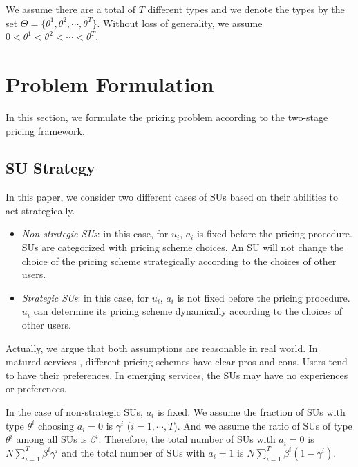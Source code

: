 \documentclass[journal]{IEEEtran}
\begin{document}
We assume there are a total of $T$ different types and we denote the types by the set $\Theta=\{\theta^1, \theta^2, \cdots, \theta^T\}$. Without loss of generality, we assume $0<\theta^1< \theta^2< \cdots <\theta^T$.

\section{Problem Formulation}
\label{sec:formulation}

In this section, we formulate the pricing problem according to the two-stage pricing framework.

\subsection{SU Strategy}

In this paper, we consider two different cases of SUs based on their abilities to act strategically.
\begin{itemize}
  \item \emph{Non-strategic SUs}: in this case, for $u_i$, $a_i$ is fixed before the pricing procedure. SUs are categorized with pricing scheme choices. An SU will not change the choice of the pricing scheme strategically according to the choices of other users.
  \item \emph{Strategic SUs}: in this case, for $u_i$, $a_i$ is not fixed before the pricing procedure. $u_i$ can determine its pricing scheme dynamically according to the choices of other users.
\end{itemize}

Actually, we argue that both assumptions are reasonable in real world. In matured services \cite{icdcs12segmentation}, different pricing schemes have clear pros and cons. Users tend to have their preferences. In emerging services, the SUs may have no experiences or preferences.

In the case of non-strategic SUs, $a_i$ is fixed. We assume the fraction of SUs with type $\theta^i$ choosing $a_i=0$ is $\gamma^i$ ($i=1,\cdots, T$). And we assume the ratio of SUs of type $\theta^i$ among all SUs is $\beta^i$. Therefore, the total number of SUs with $a_i=0$ is $N\sum_{i=1}^T\beta^i\gamma^i$ and the total number of SUs with $a_i=1$ is $N\sum_{i=1}^T\beta^i(1-\gamma^i)$.
\end{document}
